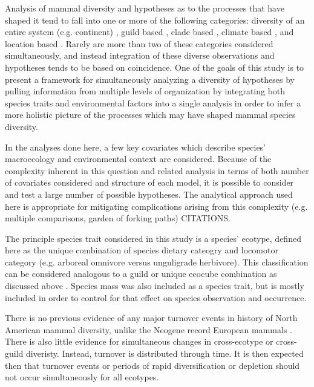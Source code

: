 \documentclass[12pt,letterpaper]{article}
\begin{document}
Analysis of mammal diversity and hypotheses as to the processes that have shaped it tend to fall into one or more of the following categories: diversity of an entire system (e.g. continent) \citep{Alroy2000g,Alroy1996a,Figueirido2012,Liow2008}, guild based \citep{Janis2004,Janis2000,Jernvall2004,Janis1993c,Pires2015a,Janis2008a}, clade based \citep{Quental2013,Slater2015c,Silvestro2015b}, climate based \citep{Blois2009,Janis1993c,Janis1993b}, and location based \citep{Eronen2015,Badgley2013}. Rarely are more than two of these categories considered simultaneously, and instead integration of these diverse observations and hypotheses tends to be based on coincidence. One of the goals of this study is to present a framework for simultaneously analyzing a diversity of hypotheses by pulling  information from multiple levels of organization by integrating both species traits and environmental factors into a single analysis in order to infer a more holistic picture of the processes which may have shaped mammal species diversity.

In the analyses done here, a few key covariates which describe species' macroecology and environmental context are considered. Because of the complexity inherent in this question and related analysis in terms of both number of covariates considered and structure of each model, it is possible to consider and test a large number of possible hypotheses. The analytical approach used here is appropriate for mitigating complications arising from this complexity (e.g. multiple comparisons, garden of forking paths) CITATIONS.

The principle species trait considered in this study is a species' ecotype, defined here as the unique combination of species dietary cateogry and locomotor category (e.g. arboreal omnivore versus unguligrade herbivore). This classification can be considered analogous to a guild or unique ecocube combination as discussed above \citep{Bush2007,Bambach2007,Bush2011}. Species mass was also included as a species trait, but is mostly included in order to control for that effect on species observation and occurrence.

There is no previous evidence of any major turnover events in history of North American mammal diversity, unlike the Neogene record European mammals \citep{Alroy2009,Alroy1996a,Eronen2015,Janis1993b,Alroy2000g}. There is also little evidence for simultaneous changes in cross-ecotype or cross-guild diveristy. Instead, turnover is distributed through time. It is then expected then that turnover events or periods of rapid diversification or depletion should not occur simultaneously for all ecotypes.
\end{document}
